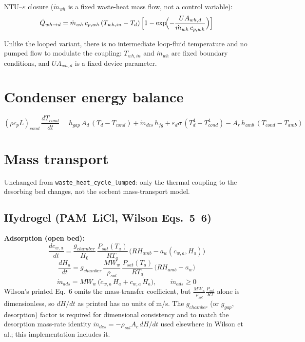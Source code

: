 \documentclass[11pt]{article}
\begin{document}
NTU--$\varepsilon$ closure ($\dot{m}_{wh}$ is a fixed waste-heat mass flow, not a control variable):
\begin{equation}
\dot{Q}_{wh\to d} = \dot{m}_{wh}\,c_{p,wh}\,(T_{wh,in} - T_d)\,\Bigl[1-\exp\!\Bigl(-\frac{UA_{wh,d}}{\dot{m}_{wh}\,c_{p,wh}}\Bigr)\Bigr]
\label{eq:Qwhd}
\end{equation}

Unlike the looped variant, there is no intermediate loop-fluid temperature and no pumped flow to modulate the coupling: $T_{wh,in}$ and $\dot{m}_{wh}$ are fixed boundary conditions, and $UA_{wh,d}$ is a fixed device parameter.

\section{Condenser energy balance}

\begin{equation}
(\rho c_p L)_{cond}\,\frac{dT_{cond}}{dt}
= h_{gap}\,A_d\,(T_d - T_{cond})
+ \dot{m}_{des}\,h_{fg}
+ \varepsilon_d\sigma\,(T_d^4 - T_{cond}^4)
- A_r\,h_{amb}\,(T_{cond} - T_{amb})
\label{eq:condenser}
\end{equation}

\section{Mass transport}

Unchanged from \texttt{waste\_heat\_cycle\_lumped}: only the thermal coupling to the desorbing bed changes, not the sorbent mass-transport model.

\subsection{Hydrogel (PAM--LiCl, Wilson Eqs.~5--6)}

\textbf{Adsorption (open bed):}
\begin{equation}
\frac{dc_{w,a}}{dt} = \frac{g_{chamber}}{H_0}\,\frac{P_{sat}(T_a)}{RT_a}\,\bigl(RH_{amb} - a_w(c_{w,a}, H_a)\bigr)
\label{eq:massads}
\end{equation}
\begin{equation}
\frac{dH_a}{dt} = g_{chamber}\,\frac{MW_w}{\rho_{sol}}\,\frac{P_{sat}(T_a)}{RT_a}\,\bigl(RH_{amb} - a_w\bigr)
\end{equation}
\begin{equation}
\dot{m}_{ads} = MW_w\,\bigl(\dot{c}_{w,a}\,H_a + c_{w,a}\,\dot{H}_a\bigr), \qquad \dot{m}_{ads} \ge 0
\end{equation}
Wilson's printed Eq.~6 omits the mass-transfer coefficient, but $\frac{MW_w}{\rho_{sol}}\frac{P_{sat}}{RT}$ alone is dimensionless, so $dH/dt$ as printed has no units of m/s. The $g_{chamber}$ (or $g_{gap}$, desorption) factor is required for dimensional consistency and to match the desorption mass-rate identity $\dot{m}_{des} = -\rho_{sol}A_c\,dH/dt$ used elsewhere in Wilson et al.; this implementation includes it.
\end{document}
